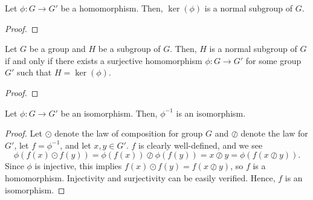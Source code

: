 \begin{thm}\label{thm:ker_normal_subgroup}
Let $ \phi:G\to G' $ be a homomorphism. Then, $ \ker(\phi) $ is a normal subgroup of $ G $.
\end{thm}
\begin{proof}
\end{proof}

\begin{thm}
Let $ G $ be a group and $ H $ be a subgroup of $ G $. Then, $ H $ is a normal subgroup of $ G $ if and only if there exists a surjective homomorphism $ \phi:G\to G' $ for some group $ G' $ such that $ H=\ker(\phi) $.
\end{thm}
\begin{proof}
\end{proof}

\begin{thm}
Let $ \phi:G\to G' $ be an isomorphism. Then, $ \phi^{-1} $ is an isomorphism.
\end{thm}
\begin{proof}
Let $ \odot $ denote the law of composition for group $ G $ and $ \oslash $ denote the law for $ G' $, let $ f=\phi^{-1} $, and let $ x,y\in G' $.  $ f $ is clearly well-defined, and we see
\begin{equation*}
    \phi(f(x)\odot f(y))=\phi(f(x))\oslash\phi(f(y))=x\oslash y=\phi(f(x\oslash y)).
\end{equation*}
Since $ \phi $ is injective, this implies $ f(x)\odot f(y)=f(x\oslash y) $, so $ f $ is a homomorphism. Injectivity and surjectivity can be easily verified. Hence, $ f $ is an isomorphism.
\end{proof}

